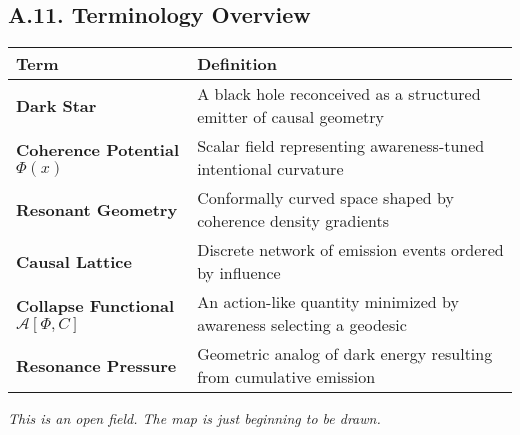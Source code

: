 \subsection*{A.11. Terminology Overview}

\begin{table}[H]
\centering
\begin{tabular}{l p{10cm}}
\toprule
\textbf{Term} & \textbf{Definition} \\
\midrule
\textbf{Dark Star} & A black hole reconceived as a structured emitter of causal geometry \\
\textbf{Coherence Potential} \( \Phi(x) \) & Scalar field representing awareness-tuned intentional curvature \\
\textbf{Resonant Geometry} & Conformally curved space shaped by coherence density gradients \\
\textbf{Causal Lattice} & Discrete network of emission events ordered by influence \\
\textbf{Collapse Functional} \( \mathcal{A}[\Phi, C] \) & An action-like quantity minimized by awareness selecting a geodesic \\
\textbf{Resonance Pressure} & Geometric analog of dark energy resulting from cumulative emission \\
\bottomrule
\end{tabular}
\end{table}

\begin{center}
\emph{This is an open field. The map is just beginning to be drawn.}
\end{center}
